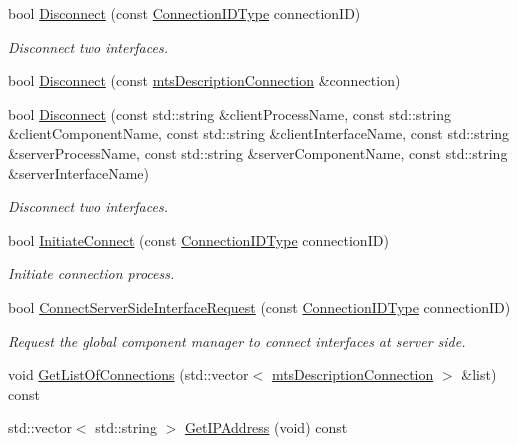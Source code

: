 \begin{DoxyCompactItemize}
bool \hyperlink{classmts_manager_global_a76821bdfa173c602a1e2822abbd30207}{Disconnect} (const \hyperlink{mts_forward_declarations_8h_ad3543bb11742e1766374ec96016d6547}{Connection\-I\-D\-Type} connection\-I\-D)
\begin{DoxyCompactList}\small\item\em Disconnect two interfaces. \end{DoxyCompactList}\item 
bool \hyperlink{classmts_manager_global_a8f1aacccac9488a3ec0aeb4ecc547c7c}{Disconnect} (const \hyperlink{classmts_description_connection}{mts\-Description\-Connection} \&connection)
\item 
bool \hyperlink{classmts_manager_global_abfa53d9b4051f79c7b413ce1fa2b8cc9}{Disconnect} (const std\-::string \&client\-Process\-Name, const std\-::string \&client\-Component\-Name, const std\-::string \&client\-Interface\-Name, const std\-::string \&server\-Process\-Name, const std\-::string \&server\-Component\-Name, const std\-::string \&server\-Interface\-Name)
\begin{DoxyCompactList}\small\item\em Disconnect two interfaces. \end{DoxyCompactList}\item 
bool \hyperlink{classmts_manager_global_a395aea7f5f6c28d676bd9f2d05b72ff6}{Initiate\-Connect} (const \hyperlink{mts_forward_declarations_8h_ad3543bb11742e1766374ec96016d6547}{Connection\-I\-D\-Type} connection\-I\-D)
\begin{DoxyCompactList}\small\item\em Initiate connection process. \end{DoxyCompactList}\item 
bool \hyperlink{classmts_manager_global_acf0a8009a35013ec30c1fddda725eb20}{Connect\-Server\-Side\-Interface\-Request} (const \hyperlink{mts_forward_declarations_8h_ad3543bb11742e1766374ec96016d6547}{Connection\-I\-D\-Type} connection\-I\-D)
\begin{DoxyCompactList}\small\item\em Request the global component manager to connect interfaces at server side. \end{DoxyCompactList}\item 
void \hyperlink{classmts_manager_global_ab53df6ad67125ff7682e5a091287d2ec}{Get\-List\-Of\-Connections} (std\-::vector$<$ \hyperlink{classmts_description_connection}{mts\-Description\-Connection} $>$ \&list) const 
\item 
std\-::vector$<$ std\-::string $>$ \hyperlink{classmts_manager_global_a9a61d5f94f5cef7bb85b4184fbb971cd}{Get\-I\-P\-Address} (void) const 

\end{DoxyCompactItemize}
